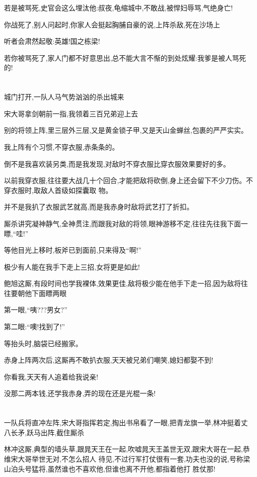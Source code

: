 ﻿\documentclass[12pt]{article}
\begin{document}
若是被骂死,史官会这么埋汰他:叔夜,龟缩城中,不敢战,被悍妇辱骂,气绝身亡!

你战死了,别人问起时,你家人会挺起胸脯自豪的说,上阵杀敌,死在沙场上

听者会肃然起敬:英雄!国之栋梁!

若你被骂死了,家人门都不好意思出,总不能大言不惭的到处炫耀:我爹是被人骂死的!

\section{}

城门打开,一队人马气势汹汹的杀出城来

宋大哥拿剑朝前一指,我领着三百兄弟迎上去

别的将领上阵,里三层外三层,又是黄金锁子甲,又是天山金蝉丝,包裹的严严实实。

我上阵有个习惯,不穿衣服,赤条条的。

倒不是我喜欢装另类,而是我发现,对敌时不穿衣服比穿衣服效果要好的多。

以前我穿衣服,往往要大战几十个回合,才能把敌将砍倒,身上还会留下不少刀伤。不穿衣服时,取敌人首级如探囊取
物。

并不是我扒了衣服武艺就高,而是我赤身时敌将武艺打了折扣。

厮杀讲究凝神静气,全神贯注,而跟我对敌的将领,眼神游移不定,往往先往我下面一瞟,``哇!''

等他目光上移时,板斧已到面前,只来得及``啊!''

极少有人能在我手下走上三招,女将更是如此!

鲍旭这厮,有段时间也学我裸体,效果更佳,敌将极少能在他手下走一招,因为敌将往往要朝他下面瞟两眼

第一眼,``咦???男女?''

第二眼:``噢!找到了!''

等抬头时,脑袋已经搬家。

赤身上阵两次后,这厮再不敢扒衣服,天天被兄弟们嘲笑,媳妇都娶不到!

你看我,天天有人追着给我说亲!

没那二两本钱,还学我赤身,弄的现在还是光棍一条!
\section{}

一队兵将直冲左阵,宋大哥指挥若定,掏出书帛看了一眼,把青龙旗一举,林冲挺着丈八长矛,跃马出阵,截住厮杀

林冲这厮,典型的墙头草,跟晁天王在一起,吹嘘晁天王盖世无双,跟宋大哥在一起,恭维宋大哥举世无对,不怎么招人
待见,不过行军打仗很有一套,功夫也没的说,号称梁山泊头号猛将,虽然谁也不喜欢他,但谁也离不开他,都指着他打
胜仗那!
\end{document}
